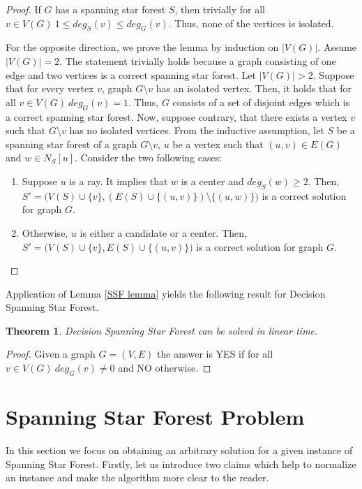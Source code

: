 \documentclass[en]{pracamgr}
\newtheorem{theorem}{Theorem}
\newcommand{\ssf}{spanning star forest}
\newcommand{\ssfp}{{\sc Spanning Star Forest}}
\newcommand{\dssfp}{{\sc Decision Spanning Star Forest}}
\begin{document}
\begin{proof}
	If $G$ has a \ssf{} $S$, then trivially for all $v \in V(G)\ 1 \leq deg_S(v) \leq deg_G(v)$. Thus, none of the vertices is isolated.
	
	For the opposite direction, we prove the lemma by induction on $|V(G)|$. Assume $|V(G)|=2$. The statement trivially holds because a graph consisting of one edge and two vertices is a correct \ssf{}. Let $|V(G)| >2$. Suppose that for every vertex $v$, graph $G \setminus v$ has an isolated vertex. Then, it holds that for all $v \in V(G)\ deg_G(v)=1$. Thus, $G$ consists of a set of disjoint edges which is a correct \ssf{}. Now, suppose contrary, that there exists a vertex $v$ such that $G \setminus v$ has no isolated vertices. From the inductive assumption, let $S$ be a \ssf{} of a graph $G \setminus v$, $u$ be a vertex such that $(u,v) \in E(G)$ and $w \in N_S[u]$. Consider the two following cases:
	\begin{enumerate}
		\item Suppose $u$ is a ray. It implies that $w$ is a center and $deg_S(w) \geq 2$. Then, $S'=\big(V(S) \cup \{v\},(E(S) \cup \{(u,v)\}) \setminus \{(u,w)\}\big)$ is a correct solution for graph $G$.
		\item Otherwise, $u$ is either a candidate or a center. Then, $S'=\big(V(S) \cup \{v\}, E(S) \cup \{(u,v)\}\big)$ is a correct solution for graph $G$.
	\end{enumerate}
	
\end{proof}
	Application of Lemma \ref{SSF lemma} yields the following result for \dssfp{}.

\begin{theorem}
	\dssfp{} can be solved in linear time.
\end{theorem}

\begin{proof}
	Given a graph $G = (V,E)$ the answer is YES if for all $v \in V(G)\ deg_G(v) \neq 0$ and NO otherwise.
\end{proof}

\section{Spanning Star Forest Problem}

In this section we focus on obtaining an arbitrary solution for a given instance of \ssfp{}. Firstly, let us introduce two claims which help to normalize an instance and make the algorithm more clear to the reader.
\end{document}
